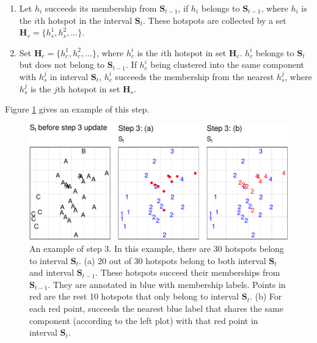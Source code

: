 \begin{enumerate}
\def\labelenumi{(\alph{enumi})}
\item
  Let \(h_i\) succeeds its membership from \(\boldsymbol{S}_{t-1}\), if
  \(h_i\) belongs to \(\boldsymbol{S}_{t-1}\), where \(h_i\) is the
  \(i\)th hotspot in the interval \(\boldsymbol{S}_t\). These hotspots
  are collected by a set \(\boldsymbol{H}_s = \{h_s^1,h_s^2,...\}\).
\item
  Set \(\boldsymbol{H}_c = \{h_c^1,h_c^2,...\}\), where \(h_c^i\) is the
  \(i\)th hotspot in set \(\boldsymbol{H}_c\). \(h_c^i\) belongs to
  \(\boldsymbol{S}_t\) but does not belong to \(\boldsymbol{S}_{t-1}\).
  If \(h_c^i\) being clustered into the same component with \(h_s^j\) in
  interval \(\boldsymbol{S}_t\), \(h_c^i\) succeeds the membership from
  the nearest \(h_s^j\), where \(h_s^j\) is the \(j\)th hotspot in set
  \(\boldsymbol{H}_s\).
\end{enumerate}

Figure \ref{fig:step3figs} gives an example of this step.

\begin{Schunk}
\begin{figure}

{\centering \includegraphics[width=0.8\linewidth]{clustering_paper_files/figure-latex/step3figs-1} 

}

\caption{An example of step 3. In this example, there are 30 hotspots belong to interval $\boldsymbol{S}_t$. (a) 20 out of 30 hotspots belong to both interval $\boldsymbol{S}_t$ and interval $\boldsymbol{S}_{t-1}$. These hotspots succeed their memberships from $\boldsymbol{S}_{t-1}$. They are annotated in blue with membership labels. Points in red are the rest 10 hotspots that only belong to interval $\boldsymbol{S}_t$. (b) For each red point, succeeds the nearest blue label that shares the same component (according to the left plot) with that red point in interval $\boldsymbol{S}_t$. }\label{fig:step3figs}
\end{figure}
\end{Schunk}

